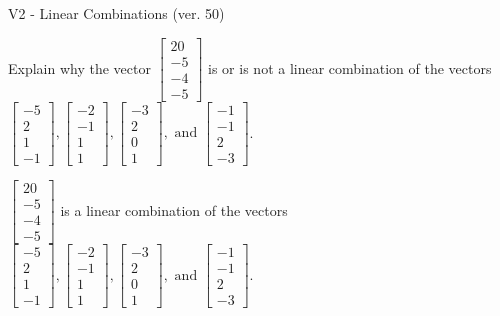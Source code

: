 \begin{exercise}
  \begin{exerciseTitle}V2 - Linear Combinations (ver. 50)\end{exerciseTitle}
  \begin{exerciseStatement}
    Explain why the vector \(\left[\begin{array}{c}
20 \\
-5 \\
-4 \\
-5
\end{array}\right]\)  is or is not a linear 
	combination of the vectors \(\left[\begin{array}{c}
-5 \\
2 \\
1 \\
-1
\end{array}\right] , \left[\begin{array}{c}
-2 \\
-1 \\
1 \\
1
\end{array}\right] , \left[\begin{array}{c}
-3 \\
2 \\
0 \\
1
\end{array}\right] , \text{ and } \left[\begin{array}{c}
-1 \\
-1 \\
2 \\
-3
\end{array}\right]\).
	


  \end{exerciseStatement}
  \begin{exerciseAnswer}
   \(\left[\begin{array}{c}
20 \\
-5 \\
-4 \\
-5
\end{array}\right]\) 
  	 is  
	a linear combination of the vectors \(\left[\begin{array}{c}
-5 \\
2 \\
1 \\
-1
\end{array}\right] , \left[\begin{array}{c}
-2 \\
-1 \\
1 \\
1
\end{array}\right] , \left[\begin{array}{c}
-3 \\
2 \\
0 \\
1
\end{array}\right] , \text{ and } \left[\begin{array}{c}
-1 \\
-1 \\
2 \\
-3
\end{array}\right]\).


\end{exerciseAnswer}
\end{exercise}
